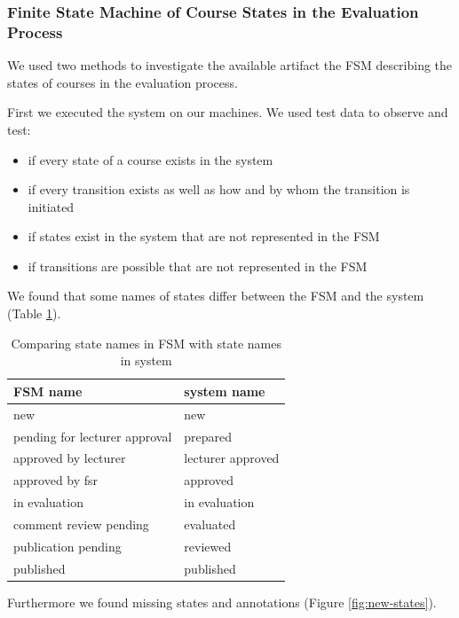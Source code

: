 \subsubsection{Finite State Machine of Course States in the Evaluation Process}
We used two methods to investigate the available artifact the FSM describing the states of courses in the evaluation process.

First we executed the system on our machines.
We used test data to observe and test:
\begin{itemize}
    \item if every state of a course exists in the system
    \item if every transition exists as well as how and by whom the transition is initiated
    \item if states exist in the system that are not represented in the FSM
    \item if transitions are possible that are not represented in the FSM
\end{itemize} 

We found that some names of states differ between the FSM and the system (Table \ref{tab:state-names}). 
\begin{table}[]
    \centering
    \label{tab:state-names}
    \begin{tabular}{|l|l|}
        \hline
        FSM name                      & system name       \\ \hline \hline
        new                           & new               \\ \hline
        pending for lecturer approval & prepared          \\ \hline
        approved by lecturer          & lecturer approved \\ \hline
        approved by fsr               & approved          \\ \hline
        in evaluation                 & in evaluation     \\ \hline
        comment review pending        & evaluated         \\ \hline
        publication pending           & reviewed          \\ \hline
        published                     & published         \\ \hline
    \end{tabular}
    \caption{Comparing state names in FSM with state names in system}
\end{table}

Furthermore we found missing states and annotations (Figure \ref{fig:new-states}).

